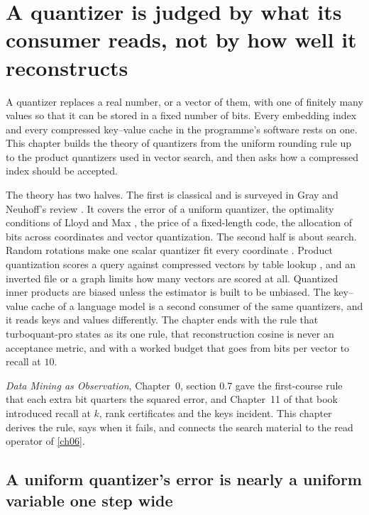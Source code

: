 \chapter{A quantizer is judged by what its consumer reads, not by how well it reconstructs}\label{ch07}

A quantizer replaces a real number, or a vector of them, with one of finitely many values so that it can be stored in a fixed number of bits. Every embedding index and every compressed key--value cache in the programme's software rests on one. This chapter builds the theory of quantizers from the uniform rounding rule up to the product quantizers used in vector search, and then asks how a compressed index should be accepted.

The theory has two halves. The first is classical and is surveyed in Gray and Neuhoff's review \cite{grayneuhoff1998}. It covers the error of a uniform quantizer, the optimality conditions of Lloyd and Max \cite{lloyd1982,max1960}, the price of a fixed-length code, the allocation of bits across coordinates and vector quantization. The second half is about search. Random rotations make one scalar quantizer fit every coordinate \cite{zandieh2025turboquant}. Product quantization scores a query against compressed vectors by table lookup \cite{jegou2011pq}, and an inverted file or a graph limits how many vectors are scored at all. Quantized inner products are biased unless the estimator is built to be unbiased. The key--value cache of a language model is a second consumer of the same quantizers, and it reads keys and values differently. The chapter ends with the rule that turboquant-pro states as its one rule, that reconstruction cosine is never an acceptance metric, and with a worked budget that goes from bits per vector to recall at $10$.

\emph{Data Mining as Observation}, Chapter~0, section 0.7 gave the first-course rule that each extra bit quarters the squared error, and Chapter~11 of that book introduced recall at $k$, rank certificates and the keys incident. This chapter derives the rule, says when it fails, and connects the search material to the read operator of \cref{ch06}.

\section{A uniform quantizer's error is nearly a uniform variable one step wide}\label{sec:ch07:uniform}

